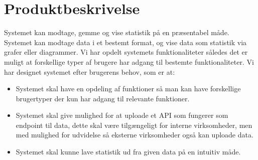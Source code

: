 \section{Produktbeskrivelse}
Systemet kan modtage, gemme og vise statistik på en præsentabel måde. Systemet kan modtage data i et bestemt format, og vise data som statistik via grafer eller diagrammer.
Vi har opdelt systemets funktionaliteter således det er muligt at forskellige typer af brugere har adgang til bestemte funktionaliteter.
Vi har designet systemet efter brugerens behov, som er at: 
\begin{itemize}
    \item Systemet skal have en opdeling af funktioner så man kan have forskellige brugertyper der kun har adgang til relevante funktioner.
    \item Systemet skal give mulighed for at uploade et API som fungerer som endpoint til data, dette skal være tilgængeligt for interne virksomheder, men med mulighed for udvidelse så eksterne virksomheder også kan uploade data.
    \item Systemet skal kunne lave statistik ud fra given data på en intuitiv måde.
\end{itemize}
